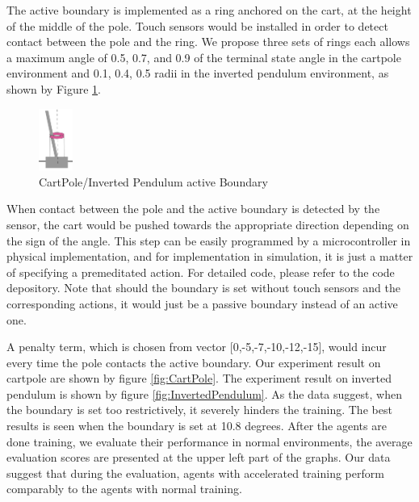 \documentclass[journal]{IEEEtran}
\begin{document}
The active boundary is implemented as a ring anchored on the cart, at the height of the middle of the pole. Touch sensors would be installed in order to detect contact between the pole and the ring. We propose three sets of rings each allows a maximum angle of 0.5, 0.7, and 0.9 of the terminal state angle in the cartpole environment and 0.1, 0.4, 0.5 radii in the inverted pendulum environment, as shown by Figure \ref{fig:cartpolePB}. 

\begin{figure}
     \centering
      \includegraphics[width=0.1\textwidth]{cartpole1.png}
      \caption{CartPole/Inverted Pendulum active Boundary}
      \label{fig:cartpolePB}
\end{figure}
When contact between the pole and the active boundary is detected by the sensor, the cart would be pushed towards the appropriate direction depending on the sign of the angle. This step can be easily programmed by a microcontroller in physical implementation, and for implementation in simulation, it is just a matter of specifying a premeditated action. For detailed code, please refer to the code depository. Note that should the boundary is set without touch sensors and the corresponding actions, it would just be a passive boundary instead of an active one. 

A penalty term, which is chosen from vector [0,-5,-7,-10,-12,-15], would incur every time the pole contacts the active boundary. Our experiment result on cartpole are shown by figure \ref{fig:CartPole}. The experiment result on inverted pendulum is shown by figure \ref{fig:InvertedPendulum}. As the data suggest, when the boundary is set too restrictively, it severely hinders the training. The best results is seen when the boundary is set at 10.8 degrees. After the agents are done training, we evaluate their performance in normal environments, the average evaluation scores are presented at the upper left part of the graphs. Our data suggest that during the evaluation, agents with accelerated training perform comparably to the agents with normal training.
\end{document}
